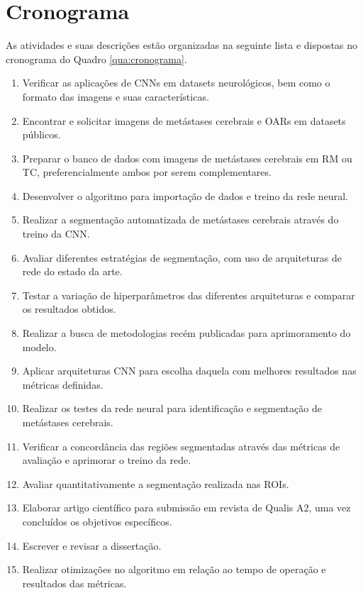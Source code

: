 \chapter{Cronograma}\label{chap:cronograma}

As atividades e suas descrições estão organizadas na seguinte lista e dispostas no cronograma do Quadro \ref{qua:cronograma}.

\begin{enumerate}[I]
    \item Verificar as aplicações de CNNs em datasets neurológicos, bem como o formato das imagens e suas características.
    \item Encontrar e solicitar imagens de metástases cerebrais e OARs em datasets públicos.
    \item Preparar o banco de dados com imagens de metástases cerebrais em RM ou TC, preferencialmente ambos por serem complementares.
    \item Desenvolver o algoritmo para importação de dados e treino da rede neural.
    \item Realizar a segmentação automatizada de metástases cerebrais através do treino da CNN.
    \item Avaliar diferentes estratégias de segmentação, com uso de arquiteturas de rede do estado da arte.
    \item Testar a variação de hiperparâmetros das diferentes arquiteturas e comparar os resultados obtidos.
    \item Realizar a busca de metodologias recém publicadas para aprimoramento do modelo.
    \item Aplicar arquiteturas CNN para escolha daquela com melhores resultados nas métricas definidas.
    \item Realizar os testes da rede neural para identificação e segmentação de metástases cerebrais.
    \item Verificar a concordância das regiões segmentadas através das métricas de avaliação e aprimorar o treino da rede.
    \item Avaliar quantitativamente a segmentação realizada nas ROIs.
    \item Elaborar artigo científico para submissão em revista de Qualis A2, uma vez concluídos os objetivos específicos.
    \item Escrever e revisar a dissertação.
    \item Realizar otimizações no algoritmo em relação ao tempo de operação e resultados das métricas.
\end{enumerate}


